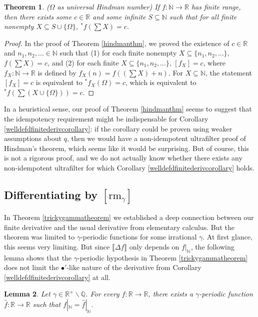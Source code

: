 \documentclass[microtype]{jloganal}
\newtheorem{theorem}{Theorem}
\newtheorem{lemma}[theorem]{Lemma}
\def\RM{\mathrm{rm}}
\begin{document}
\begin{theorem}
    ($\Omega$ as universal Hindman number)
    If $f:\mathbb N\to\mathbb R$ has finite range,
    then there exists some $c\in \mathbb R$
    and some infinite $S\subseteq \mathbb N$
    such that for all finite nonempty $X\subseteq S\cup\{\Omega\}$,
    ${}^*f(\sum X)=c$.
\end{theorem}

\begin{proof}
    In the proof of Theorem \ref{hindmanthm}, we proved the existence
    of $c\in\mathbb R$ and $n_1,n_2,\ldots\in \mathbb N$ such that
    (1) for each finite nonempty
    $X\subseteq \{n_1,n_2,\ldots\}$, $f(\sum X)=c$, and (2) for each finite
    $X\subseteq \{n_1,n_2,\ldots\}$, $[f_X]=c$, where
    $f_X:\mathbb N\to\mathbb R$ is defined by $f_X(n)=f((\sum X)+n)$.
    For $X\subseteq\mathbb N$, the statement $[f_X]=c$ is equivalent
    to ${}^*f_X(\Omega)=c$,
    which is equivalent to ${}^*f(\sum(X\cup\{\Omega\}))=c$.
\end{proof}

In a heuristical sense, our proof of Theorem \ref{hindmanthm}
seems to suggest that the idempotency requirement might be indispensable for
Corollary \ref{welldefdfinitederivcorollary}: if the corollary
could be proven using weaker assumptions about $q$, then we would have a
non-idempotent ultrafilter proof of Hindman's theorem,
which seems like it would be surprising. But of course,
this is not a rigorous proof, and we do not actually know whether
there exists any non-idempotent ultrafilter for which
Corollary \ref{welldefdfinitederivcorollary} holds.

\subsection{Differentiating by $[\RM_\gamma]$}


In Theorem \ref{trickygammatheorem} we established a deep connection
between our finite derivative and the usual derivative from elementary
calculus. But the theorem was limited to $\gamma$-periodic functions for
some irrational $\gamma$. At first glance, this seems very limiting.
But since $\llbracket\Delta f\rrbracket$ only depends on $f|_\mathbb N$,
the following lemma shows that the $\gamma$-periodic hypothesis
in Theorem \ref{trickygammatheorem} does not limit the $\bullet'$-like
nature of the derivative from Corollary \ref{welldefdfinitederivcorollary}
at all.

\begin{lemma}
    Let $\gamma\in \mathbb R^+\backslash \mathbb Q$.
    For every $f:\mathbb R\to\mathbb R$, 
    there exists a $\gamma$-periodic function $\hat f:\mathbb R\to\mathbb R$
    such that $f|_\mathbb N=\hat f|_\mathbb N$.
\end{lemma}
\end{document}
